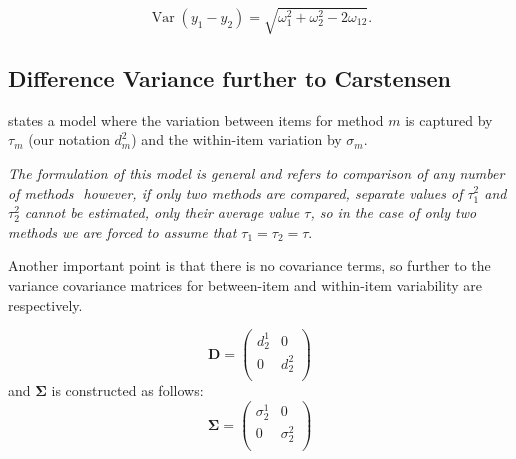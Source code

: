 \documentclass[12pt, a4paper]{report}
\theoremstyle{plain}
\theoremstyle{definition}
\theoremstyle{remark}
\begin{document}
\[
\operatorname{Var}(y_1 - y_2) = \sqrt{ \omega^2_1 + \omega^2_2 - 2\omega_{12}}.
\]






	\subsection{Difference Variance further to Carstensen}
	
	\citet{BXC2008} states a model where the variation between items
	for method $m$ is captured by $\tau_m$ (our notation $d^2_m$) and the within-item
	variation by $\sigma_m$.
	
	\emph{The formulation of this model is general and refers to comparison
		of any number of methods  however, if only two methods are
		compared, separate values of $\tau^2_1$ and $\tau^2_2$ cannot be
		estimated, only their average value $\tau$, so in the case of only
		two methods we are forced to assume that $\tau_1 = \tau_2 = \tau$}\citep{BXC2008}.
	
	Another important point is that there is no covariance terms, so
	further to  \citet{BXC2008} the variance covariance matrices for
	between-item and within-item variability are respectively.
	
	\[\boldsymbol{D} = \left(
	\begin{array}{cc}
	d^1_2  & 0 \\
	0 & d^2_2 \\
	\end{array}
	\right) \]
	and  $\boldsymbol{\Sigma}$ is constructed as follows:
	\[\boldsymbol{\Sigma} = \left(
	\begin{array}{cc}
	\sigma^1_2  & 0 \\
	0 & \sigma^2_2 \\
	\end{array}
	\right) \]
	
\end{document}
